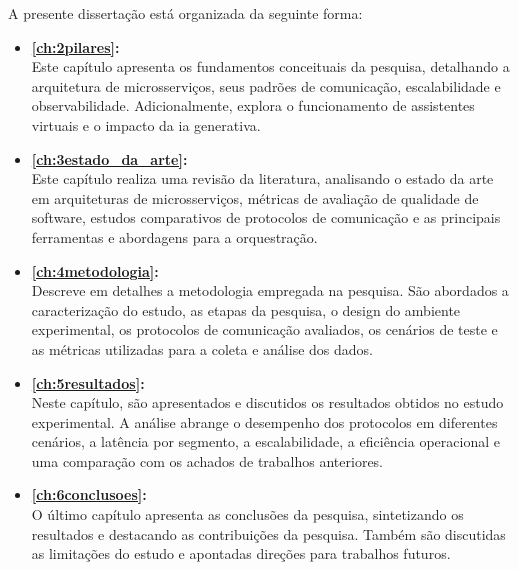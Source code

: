 A presente dissertação está organizada da seguinte forma:
\begin{itemize}
    \item \textbf{\autoref{ch:2pilares}: } \\
    Este capítulo apresenta os fundamentos conceituais da pesquisa, detalhando a arquitetura de microsserviços, seus padrões de comunicação, escalabilidade e observabilidade. Adicionalmente, explora o funcionamento de assistentes virtuais e o impacto da \acrfull{ia} generativa.

    \item \textbf{\autoref{ch:3estado_da_arte}: } \\
    Este capítulo realiza uma revisão da literatura, analisando o estado da arte em arquiteturas de microsserviços, métricas de avaliação de qualidade de software, estudos comparativos de protocolos de comunicação e as principais ferramentas e abordagens para a orquestração.

    \item \textbf{\autoref{ch:4metodologia}: } \\
    Descreve em detalhes a metodologia empregada na pesquisa. São abordados a caracterização do estudo, as etapas da pesquisa, o design do ambiente experimental, os protocolos de comunicação avaliados, os cenários de teste e as métricas utilizadas para a coleta e análise dos dados.

    \item \textbf{\autoref{ch:5resultados}: } \\
    Neste capítulo, são apresentados e discutidos os resultados obtidos no estudo experimental. A análise abrange o desempenho dos protocolos em diferentes cenários, a latência por segmento, a escalabilidade, a eficiência operacional e uma comparação com os achados de trabalhos anteriores.

    \item \textbf{\autoref{ch:6conclusoes}: } \\
    O último capítulo apresenta as conclusões da pesquisa, sintetizando os resultados e destacando as contribuições da pesquisa. Também são discutidas as limitações do estudo e apontadas direções para trabalhos futuros.
\end{itemize}